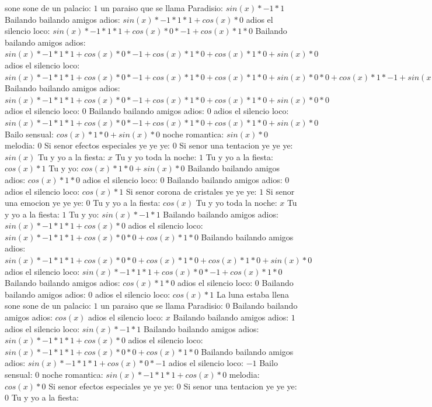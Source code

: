 \documentclass{article}
\begin{document}
sone sone de un palacio: $1$  \newline un paraiso que se llama Paradisio: $sin(x)*-1*1$ Bailando bailando amigos adios: $sin(x)*-1*1*1+cos(x)*0$ adios el silencio loco: ${sin(x)*-1*1*1+cos(x)*0}*-1+cos(x)*1*0$ Bailando bailando amigos adios: ${sin(x)*-1*1*1+cos(x)*0}*-1+cos(x)*1*0+cos(x)*1*0+sin(x)*0$ adios el silencio loco: ${{sin(x)*-1*1*1+cos(x)*0}*-1+cos(x)*1*0+cos(x)*1*0+sin(x)*0}*0+{cos(x)*1*-1+sin(x)*0}*0$ Bailando bailando amigos adios: ${{sin(x)*-1*1*1+cos(x)*0}*-1+cos(x)*1*0+cos(x)*1*0+sin(x)*0}*0$ adios el silencio loco: $0$ Bailando bailando amigos adios: $0$  \newline adios el silencio loco: ${sin(x)*-1*1*1+cos(x)*0}*-1+cos(x)*1*0+cos(x)*1*0+sin(x)*0$  \newline Bailo sensual: $cos(x)*1*0+sin(x)*0$  \newline noche romantica: $sin(x)*0$ melodia: $0$ Si senor efectos especiales ye ye ye: $0$  \newline Si senor una tentacion ye ye ye: $sin(x)$  \newline Tu y yo a la fiesta: $x$ Tu y yo toda la noche: $1$  \newline Tu y yo a la fiesta: $cos(x)*1$ Tu y yo: $cos(x)*1*0+sin(x)*0$ Bailando bailando amigos adios: $cos(x)*1*0$ adios el silencio loco: $0$ Bailando bailando amigos adios: $0$  \newline adios el silencio loco: $cos(x)*1$ Si senor corona de cristales ye ye ye: $1$ Si senor una emocion ye ye ye: $0$  \newline Tu y yo a la fiesta: $cos(x)$  \newline Tu y yo toda la noche: $x$ Tu y yo a la fiesta: $1$  \newline Tu y yo: $sin(x)*-1*1$ Bailando bailando amigos adios: $sin(x)*-1*1*1+cos(x)*0$ adios el silencio loco: ${sin(x)*-1*1*1+cos(x)*0}*0+cos(x)*1*0$ Bailando bailando amigos adios: ${sin(x)*-1*1*1+cos(x)*0}*0+cos(x)*1*0+cos(x)*1*0+sin(x)*0$ adios el silencio loco: ${sin(x)*-1*1*1+cos(x)*0}*-1+cos(x)*1*0$  \newline Bailando bailando amigos adios: $cos(x)*1*0$ adios el silencio loco: $0$ Bailando bailando amigos adios: $0$  \newline adios el silencio loco: $cos(x)*1$ La luna estaba llena sone sone de un palacio: $1$ un paraiso que se llama Paradisio: $0$  \newline Bailando bailando amigos adios: $cos(x)$  \newline adios el silencio loco: $x$ Bailando bailando amigos adios: $1$  \newline adios el silencio loco: $sin(x)*-1*1$ Bailando bailando amigos adios: $sin(x)*-1*1*1+cos(x)*0$ adios el silencio loco: ${sin(x)*-1*1*1+cos(x)*0}*0+cos(x)*1*0$ Bailando bailando amigos adios: ${sin(x)*-1*1*1+cos(x)*0}*-1$ adios el silencio loco: $-1$ Bailo sensual: $0$  \newline noche romantica: $sin(x)*-1*1*1+cos(x)*0$  \newline melodia: $cos(x)*0$ Si senor efectos especiales ye ye ye: $0$ Si senor una tentacion ye ye ye: $0$  \newline Tu y yo a la fiesta: 
\end{document}
